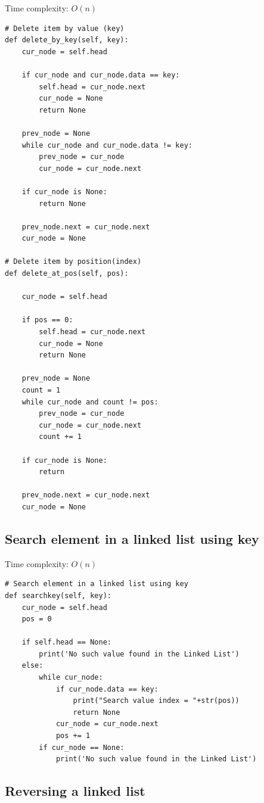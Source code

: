 \documentclass[a4paper,11pt]{book}
\begin{document}
\noindent Time complexity: $O(n)$

\begin{lstlisting}
# Delete item by value (key)
def delete_by_key(self, key):
    cur_node = self.head

    if cur_node and cur_node.data == key:
        self.head = cur_node.next
        cur_node = None
        return None

    prev_node = None 
    while cur_node and cur_node.data != key:
        prev_node = cur_node
        cur_node = cur_node.next

    if cur_node is None:
        return None

    prev_node.next = cur_node.next
    cur_node = None

# Delete item by position(index)
def delete_at_pos(self, pos):

    cur_node = self.head

    if pos == 0:
        self.head = cur_node.next
        cur_node = None
        return None

    prev_node = None
    count = 1
    while cur_node and count != pos:
        prev_node = cur_node 
        cur_node = cur_node.next
        count += 1

    if cur_node is None:
        return 

    prev_node.next = cur_node.next
    cur_node = None
\end{lstlisting}

\subsection{Search element in a linked list using key}
\vspace{5mm}

\noindent Time complexity: $O(n)$

\begin{lstlisting}
# Search element in a linked list using key
def searchkey(self, key):
    cur_node = self.head
    pos = 0
    
    if self.head == None:
        print('No such value found in the Linked List')
    else:
        while cur_node:
            if cur_node.data == key:
                print("Search value index = "+str(pos))
                return None
            cur_node = cur_node.next
            pos += 1
        if cur_node == None:
            print('No such value found in the Linked List')
\end{lstlisting}

\subsection{Reversing a linked list}
\vspace{5mm}
\end{document}
